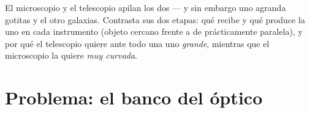 \begin{exercise}[$\star\star\star$]\label{exo:g8:lenses-images:12}
El microscopio y el telescopio apilan los dos  --- y sin embargo uno agranda gotitas y el otro galaxias.
Contrasta sus dos etapas: qué recibe y qué produce la  uno
en cada instrumento (objeto cercano frente a  de 
prácticamente paralela), y por qué el telescopio quiere ante todo una
 uno \emph{grande}, mientras que el microscopio la quiere
\emph{muy curvada}.
\end{exercise}

\section{Problema: el banco del óptico}

